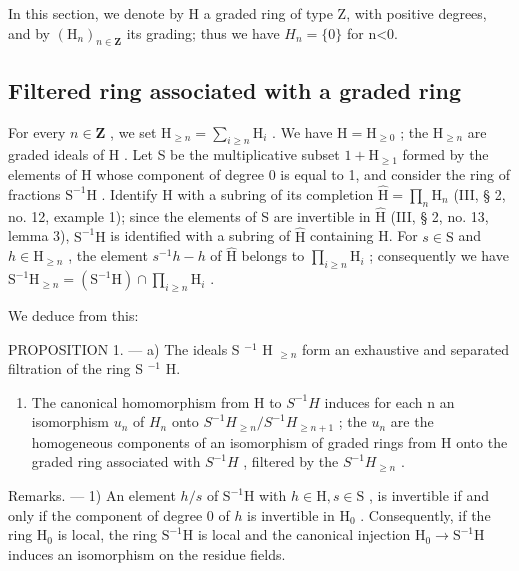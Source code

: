 In this section, we denote by H a graded ring of type Z, with positive degrees, and by \((\mathrm{H}_{n})_{n\in\mathbf{Z}}\) its grading; thus we have \(H_{n}=\{0\}\) for n\textless0.

\subsection{Filtered ring associated with a graded ring}

For every \(n \in \mathbf{Z}\) , we set \(\mathrm{H}_{\geqslant n} = \sum_{i \geqslant n} \mathrm{H}_i\) . We have \(\mathrm{H} = \mathrm{H}_{\geqslant 0}\) ; the \(\mathrm{H}_{\geqslant n}\) are graded ideals of \(\mathrm{H}\) . Let S be the multiplicative subset \(1 + \mathrm{H}_{\geqslant 1}\) formed by the elements of H whose component of degree 0 is equal to 1, and consider the ring of fractions \(\mathrm{S}^{-1}\mathrm{H}\) . Identify H with a subring of its completion \(\hat{\mathrm{H}} = \prod_{n} \mathrm{H}_{n}\) (III, § 2, no. 12, example 1); since the elements of S are invertible in \(\hat{\mathrm{H}}\) (III, § 2, no. 13, lemma 3), \(\mathrm{S}^{-1}\mathrm{H}\) is identified with a subring of \(\hat{\mathrm{H}}\) containing H. For \(s \in \mathrm{S}\) and \(h \in \mathrm{H}_{\geqslant n}\) , the element \(s^{-1}h - h\) of \(\hat{\mathrm{H}}\) belongs to \(\prod_{i \geqslant n} \mathrm{H}_i\) ; consequently we have \(\mathrm{S}^{-1}\mathrm{H}_{\geqslant n} = (\mathrm{S}^{-1}\mathrm{H}) \cap \prod_{i \geqslant n} \mathrm{H}_i\) .

We deduce from this:

PROPOSITION 1. --- a) The ideals S \(^{-1}\) H \(_{≥n}\) form an exhaustive and separated filtration of the ring S \(^{-1}\) H.

\begin{enumerate}
\def\labelenumi{\alph{enumi})}
\setcounter{enumi}{1}
\tightlist
\item
  The canonical homomorphism from H to \(S^{-1}H\) induces for each n an isomorphism \(u_{n}\) of \(H_{n}\) onto \(S^{-1}H_{\geqslant n}/S^{-1}H_{\geqslant n+1}\) ; the \(u_{n}\) are the homogeneous components of an isomorphism of graded rings from H onto the graded ring associated with \(S^{-1}H\) , filtered by the \(S^{-1}H_{\geqslant n}\) .
\end{enumerate}

Remarks. --- 1) An element \(h/s\) of \(\mathrm{S}^{-1}\mathrm{H}\) with \(h\in\mathrm{H}, s\in\mathrm{S}\) , is invertible if and only if the component of degree 0 of \(h\) is invertible in \(\mathrm{H}_{0}\) . Consequently, if the ring \(\mathrm{H}_{0}\) is local, the ring \(\mathrm{S}^{-1}\mathrm{H}\) is local and the canonical injection \(\mathrm{H}_{0}\to\mathrm{S}^{-1}\mathrm{H}\) induces an isomorphism on the residue fields.

